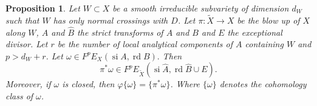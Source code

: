 \documentclass[11pt,a4paper]{amsart}
\DeclareMathOperator{\si}{si}
\DeclareMathOperator{\rd}{rd}
\numberwithin{equation}{section}
\theoremstyle{plain}
\newtheorem{prop}{Proposition}[section]
\theoremstyle{definition}
\begin{document}
\begin{prop}\label{prop:8}   Let $W\subset X$ be a smooth irreducible subvariety of
  dimension $d_{W}$ such that $W$
  has only normal crossings with $D$. Let $\pi \colon \widetilde X\to X$ be
  the blow up of  $X$ along $W$, $\widehat A$ and $\widehat B$ the
  strict transforms of $A$ and $B$ and $E$ the exceptional
  divisor. Let $r$ be the number of local analytical components of $A$ containing
  $W$ and $p> d_{W}+r$. Let
  \begin{math}
    \omega \in F^{p}E_{X}(\si A,\rd B).
  \end{math}
  Then
  \begin{displaymath}
    \pi ^{\ast}\omega \in F^{p}E_{\widetilde X}(\si \widehat A,\rd
    \widehat B\cup E).
  \end{displaymath}
 Moreover, if $\omega $ is closed, then $\varphi\{\omega \}=\{\pi
 ^{\ast} \omega \}$. Where $\{\omega \}$ denotes the cohomology class
 of $\omega $.
\end{prop}
\end{document}
